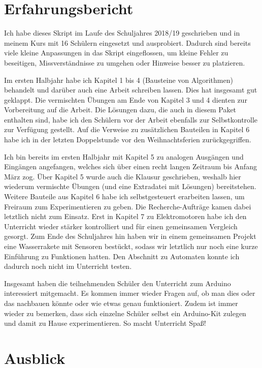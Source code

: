 \section{Erfahrungsbericht}

Ich habe dieses Skript im Laufe des Schuljahres 2018/19 geschrieben und in meinem Kurs mit 16 Schülern eingesetzt und ausprobiert. Dadurch sind bereits viele kleine Anpassungen in das Skript eingeflossen, um kleine Fehler zu beseitigen, Missverständnisse zu umgehen oder Hinweise besser zu platzieren.

Im ersten Halbjahr habe ich Kapitel 1 bis 4 (Bausteine von Algorithmen) behandelt und darüber auch eine Arbeit schreiben lassen. Dies hat insgesamt gut geklappt. Die vermischten Übungen am Ende von Kapitel 3 und 4 dienten zur Vorbereitung auf die Arbeit. Die Lösungen dazu, die auch in diesem Paket enthalten sind, habe ich den Schülern vor der Arbeit ebenfalls zur Selbstkontrolle zur Verfügung gestellt. Auf die Verweise zu zusätzlichen Bauteilen in Kapitel 6 habe ich in der letzten Doppelstunde vor den Weihnachtsferien zurückgegriffen.

Ich bin bereits im ersten Halbjahr mit Kapitel 5 zu analogen Ausgängen und Eingängen angefangen, welches sich über einen recht langen Zeitraum bis Anfang März zog. Über Kapitel 5 wurde auch die Klausur geschrieben, weshalb hier wiederum vermischte Übungen (und eine Extradatei mit Lösungen) bereitstehen. Weitere Bauteile aus Kapitel 6 habe ich selbstgesteuert erarbeiten lassen, um Freiraum zum Experimentieren zu geben. Die Recherche-Aufträge kamen dabei letztlich nicht zum Einsatz. Erst in Kapitel 7 zu Elektromotoren habe ich den Unterricht wieder stärker kontrolliert und für einen gemeinsamen Vergleich gesorgt. Zum Ende des Schuljahres hin haben wir in einem gemeinsamen Projekt eine Wasserrakete mit Sensoren bestückt, sodass wir letztlich nur noch eine kurze Einführung zu Funktionen hatten. Den Abschnitt zu Automaten konnte ich dadurch noch nicht im Unterricht testen.

Insgesamt haben die teilnehmenden Schüler den Unterricht zum Arduino interessiert mitgemacht. Es kommen immer wieder Fragen auf, ob man dies oder das nachbauen könnte oder wie etwas genau funktioniert. Zudem ist immer wieder zu bemerken, dass sich einzelne Schüler selbst ein Arduino-Kit zulegen und damit zu Hause experimentieren. So macht Unterricht Spaß!

\section{Ausblick}

